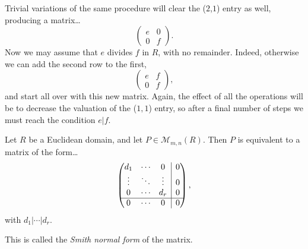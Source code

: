 Trivial variations of the same procedure will clear the ($2$,$1$) entry as well, producing a matrix\dots
\[
\begin{pmatrix}
	e & 0\\
	0 & f
\end{pmatrix}.
\]
Now we may assume that $e$ divides $f$ in $R$, with no remainder. Indeed, otherwise we can add the second row to the first,
\[
\begin{pmatrix}
	e & f\\
	0 & f
\end{pmatrix},
\]
and start all over with this new matrix. Again, the effect of all the operations will be to decrease the valuation of the
($1,1$) entry, so after a final number of steps we must reach the condition $e | f$.

\begin{proposition}
Let $R$ be a Euclidean domain, and let $P \in \mathcal{M}_{m,n}(R)$. Then $P$ is equivalent to a matrix of the form\dots
\[
\begin{pmatrix}
	d_1 & \cdots & 0 & \rvline & 0 \\
	\vdots & \ddots & \vdots & \rvline & 0 \\
	0 & \cdots & d_r & \rvline & 0 \\ \hline
	0 & \cdots & 0 & \rvline & 0
\end{pmatrix},
\]
with $d_1 | \cdots | d_r$.

This is called the \emph{Smith normal form}\label{smithnormalform} of the matrix.
\end{proposition}